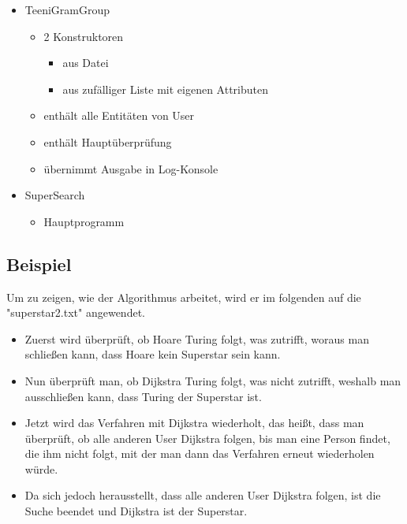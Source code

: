 \documentclass{article}
\begin{document}
\begin{flushleft}
\begin{itemize}
	\item TeeniGramGroup
	\begin{itemize}
		\item 2 Konstruktoren
		\begin{itemize}
			\item aus Datei
			\item aus zufälliger Liste mit eigenen Attributen
		\end{itemize}
		\item enthält alle Entitäten von User
		\item enthält Hauptüberprüfung
		\item übernimmt Ausgabe in Log-Konsole
	\end{itemize}
	\item SuperSearch
	\begin{itemize}
		\item Hauptprogramm
	\end{itemize}
\end{itemize}
\subsection{Beispiel}
Um zu zeigen, wie der Algorithmus arbeitet, wird er im folgenden auf die "superstar2.txt" angewendet.
\begin{itemize}
	\item Zuerst wird überprüft, ob Hoare Turing folgt, was zutrifft, woraus man schließen kann, dass Hoare kein Superstar sein kann.
	\item Nun überprüft man, ob Dijkstra Turing folgt, was nicht zutrifft, weshalb man ausschließen kann, dass Turing der Superstar ist.
	\item Jetzt wird das Verfahren mit Dijkstra wiederholt, das heißt, dass man überprüft, ob alle anderen User Dijkstra folgen, bis man eine Person findet, die ihm nicht folgt, mit der man dann das Verfahren erneut wiederholen würde.
	\item Da sich jedoch herausstellt, dass alle anderen User Dijkstra folgen, ist die Suche beendet und Dijkstra ist der Superstar.
\end{itemize}
\newpage

\end{flushleft}
\end{document}
